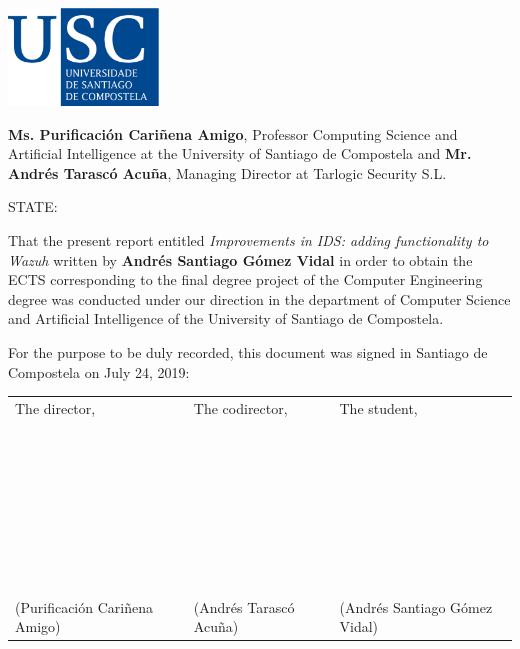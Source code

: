 \pagestyle{plain}
\includegraphics[width=4cm]{figuras/logo_usc.eps}

\vspace{1cm}
{\bf Ms. Purificación Cariñena Amigo}, Professor Computing Science and Artificial Intelligence at the University of Santiago de Compostela and {\bf Mr. Andrés Tarascó Acuña}, Managing Director at Tarlogic Security S.L.

\vspace{1cm}
STATE:

\vspace{1cm}
That the present report entitled \textit{Improvements in IDS: adding functionality to Wazuh} written by \textbf{Andrés Santiago Gómez Vidal} in order to obtain the ECTS corresponding to the final degree project of the Computer Engineering degree was conducted under our direction in the department of Computer Science and Artificial Intelligence of the University of Santiago de Compostela.

\vspace{1cm}
For the purpose to be duly recorded, this document was signed in Santiago de Compostela on July 24, 2019:

\vspace{2cm}
\footnotesize
\begin{tabular}{lll}
The director, & The codirector, & The student, \\
~ \\
~ \\
~ \\
~ \\
~ \\
~ \\
~ \\
(Purificación Cariñena Amigo) & (Andrés Tarascó Acuña) & (Andrés Santiago Gómez Vidal)
\end{tabular}
\normalsize
